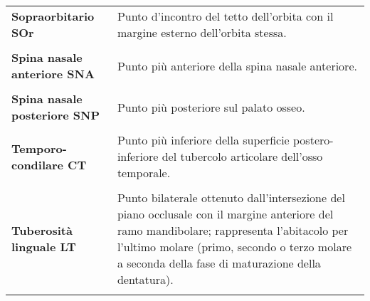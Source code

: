 \begin{longtable}{>{\bfseries}p{5cm}X}
Sopraorbitario \newline SOr & Punto d'incontro del tetto dell'orbita con il margine esterno dell'orbita stessa.\\\\
Spina nasale anteriore \newline SNA & Punto più anteriore della spina nasale anteriore.\\\\
Spina nasale posteriore \newline SNP & Punto più posteriore sul palato osseo.\\\\
Temporo-condilare \newline CT & Punto più inferiore della superficie postero-inferiore del tubercolo articolare dell'osso temporale.\\\\
Tuberosità linguale \newline LT & Punto bilaterale ottenuto dall'intersezione del piano occlusale con il margine anteriore del ramo mandibolare; rappresenta l'abitacolo per l'ultimo molare (primo, secondo o terzo molare a seconda della fase di maturazione della dentatura).\\\\
\end{longtable}
\normalsize
